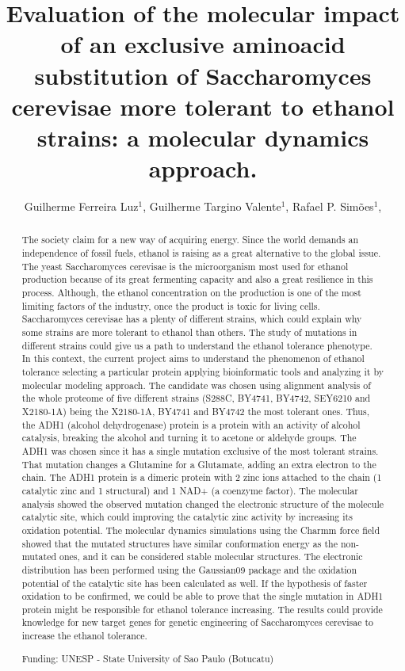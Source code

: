 \documentclass[twoside]{article}
\title{\vspace{-15mm}\fontsize{24pt}{10pt}\selectfont\textbf{ Evaluation of the molecular impact of an exclusive aminoacid substitution of Saccharomyces cerevisae more tolerant to ethanol strains:  a molecular dynamics approach. }} %
\author{ Guilherme Ferreira Luz$^{1}$, Guilherme Targino Valente$^{1}$, Rafael P. Simões$^{1}$, }
\affil{ 1 UNESP - State University of Sao Paulo

 }
\date{}
\begin{document}
  
  
  \maketitle %
  
  
  \thispagestyle{fancy} %
  
  
  \begin{abstract}
  The society claim for a new way of acquiring energy. Since the world demands an independence of fossil fuels, ethanol is raising as a great alternative to the global issue. The yeast Saccharomyces cerevisae is the microorganism most used for ethanol production because of its great fermenting capacity and also a great resilience in this process. Although, the ethanol concentration on the production is one of the most limiting factors of the industry, once the product is toxic for living cells. Saccharomyces cerevisae has a plenty of different strains, which could explain why some strains are more tolerant to ethanol than others. The study of mutations in different strains could give us a path to understand the ethanol tolerance phenotype. In this context, the current project aims to understand the phenomenon of ethanol tolerance selecting a particular protein applying bioinformatic tools and analyzing it by molecular modeling approach. The candidate was chosen using alignment analysis of the whole proteome of five different strains (S288C, BY4741, BY4742, SEY6210 and X2180-1A) being the X2180-1A, BY4741 and BY4742 the most tolerant ones. Thus, the ADH1 (alcohol dehydrogenase) protein is a protein with an activity of alcohol catalysis, breaking the alcohol and turning it to acetone or aldehyde groups. The ADH1 was chosen since it has a single mutation exclusive of the most tolerant strains. That mutation changes a Glutamine for a Glutamate, adding an extra electron to the chain. The ADH1 protein is a dimeric protein with 2 zinc ions attached to the chain (1 catalytic zinc and 1 structural) and 1 NAD+ (a coenzyme factor). The molecular analysis showed the observed mutation changed the electronic structure of the molecule catalytic site, which could improving the catalytic zinc activity by increasing its oxidation potential. The molecular dynamics simulations using the Charmm force field showed that the mutated structures have similar conformation energy as the non-mutated ones, and it can be considered stable molecular structures. The electronic distribution has been performed using the Gaussian09 package and the oxidation potential of the catalytic site has been calculated as well. If the hypothesis of faster oxidation to be confirmed, we could be able to prove that the single mutation in ADH1 protein might be responsible for ethanol tolerance increasing. The results could provide knowledge for new target genes for genetic engineering of Saccharomyces cerevisae to increase the ethanol tolerance.
  
  Funding: UNESP - State University of Sao Paulo (Botucatu) \\ 
  \end{abstract}
  
\end{document}
